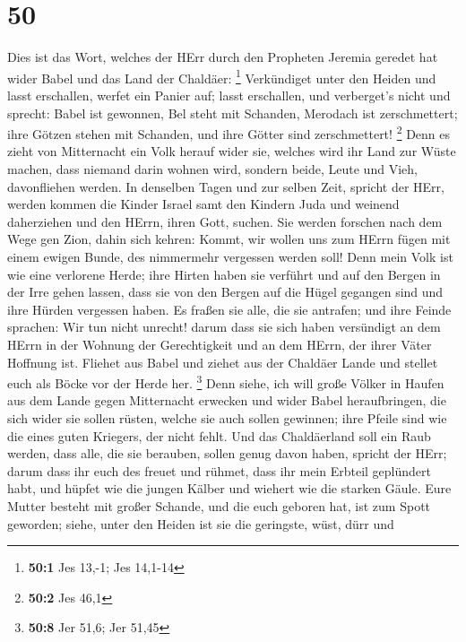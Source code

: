 \hypertarget{section-13}{%
\section{50}\label{section-13}}

 Dies ist das Wort, welches der HErr durch den Propheten
Jeremia geredet hat wider Babel und das Land der Chaldäer: \footnote{\textbf{50:1}
  Jes 13,-1; Jes 14,1-14}  Verkündiget unter den Heiden und
lasst erschallen, werfet ein Panier auf; lasst erschallen, und
verberget's nicht und sprecht: Babel ist gewonnen, Bel steht mit
Schanden, Merodach ist zerschmettert; ihre Götzen stehen mit Schanden,
und ihre Götter sind zerschmettert! \footnote{\textbf{50:2} Jes 46,1}
 Denn es zieht von Mitternacht ein Volk herauf wider sie,
welches wird ihr Land zur Wüste machen, dass niemand darin wohnen wird,
sondern beide, Leute und Vieh, davonfliehen werden.  In
denselben Tagen und zur selben Zeit, spricht der HErr, werden kommen die
Kinder Israel samt den Kindern Juda und weinend daherziehen und den
HErrn, ihren Gott, suchen.  Sie werden forschen nach dem
Wege gen Zion, dahin sich kehren: Kommt, wir wollen uns zum HErrn fügen
mit einem ewigen Bunde, des nimmermehr vergessen werden soll!
 Denn mein Volk ist wie eine verlorene Herde; ihre Hirten
haben sie verführt und auf den Bergen in der Irre gehen lassen, dass sie
von den Bergen auf die Hügel gegangen sind und ihre Hürden vergessen
haben.  Es fraßen sie alle, die sie antrafen; und ihre
Feinde sprachen: Wir tun nicht unrecht! darum dass sie sich haben
versündigt an dem HErrn in der Wohnung der Gerechtigkeit und an dem
HErrn, der ihrer Väter Hoffnung ist.  Fliehet aus Babel und
ziehet aus der Chaldäer Lande und stellet euch als Böcke vor der Herde
her. \footnote{\textbf{50:8} Jer 51,6; Jer 51,45}  Denn
siehe, ich will große Völker in Haufen aus dem Lande gegen Mitternacht
erwecken und wider Babel heraufbringen, die sich wider sie sollen
rüsten, welche sie auch sollen gewinnen; ihre Pfeile sind wie die eines
guten Kriegers, der nicht fehlt.  Und das Chaldäerland soll
ein Raub werden, dass alle, die sie berauben, sollen genug davon haben,
spricht der HErr;  darum dass ihr euch des freuet und
rühmet, dass ihr mein Erbteil geplündert habt, und hüpfet wie die jungen
Kälber und wiehert wie die starken Gäule.  Eure Mutter
besteht mit großer Schande, und die euch geboren hat, ist zum Spott
geworden; siehe, unter den Heiden ist sie die geringste, wüst, dürr und

